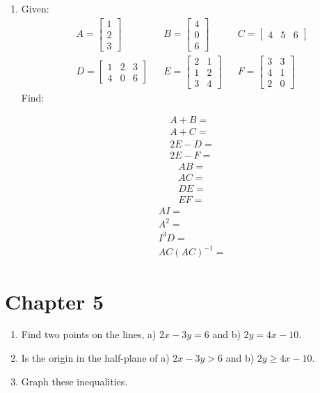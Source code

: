 \documentclass[14pt]{extarticle}
\begin{document}
\begin{enumerate}
	\item Given:
	\begin{align*}
		&A = \begin{bmatrix}
			1 \\
			2 \\
			3
		\end{bmatrix} &
		&B = \begin{bmatrix}
			4 \\
			0 \\
			6
		\end{bmatrix} &
		&C =\begin{bmatrix}
			4 & 5 & 6
		\end{bmatrix} \\
		&D = \begin{bmatrix}
			1 & 2 & 3 \\
			4 & 0 & 6
		\end{bmatrix} &
		&E = \begin{bmatrix}
			2 & 1 \\
			1 & 2 \\
			3 & 4
		\end{bmatrix} &
		&F = \begin{bmatrix}
			3 & 3 \\
			4 & 1 \\
			2 & 0
		\end{bmatrix}
	\end{align*}
	Find:
	\begin{multicols}{3}
		\begin{align*}
			&A+B = \\
			&A+C = \\
			&2E-D = \\
			&2E-F =
		\end{align*}
		\vfill\null
		\columnbreak
		\begin{align*}
			&AB = \\
			&AC = \\
			&DE = \\
			&EF =
		\end{align*}
		\vfill\null
		\columnbreak
		\begin{align*}
			&AI = \\
			&A^2 = \\
			&I^3D = \\
			&AC(AC)^{-1} =
		\end{align*}
		\vfill\null
	\end{multicols}	
\end{enumerate}


\section*{Chapter 5}
\begin{enumerate}
	\item Find two points on the lines, a) $2x-3y=6$ and b) $2y = 4x-10$.
	\item Is the origin in the half-plane of  a) $2x-3y>6$ and b) $2y \geq 4x-10$.
	\item Graph these inequalities.
\end{enumerate}
\end{document}
